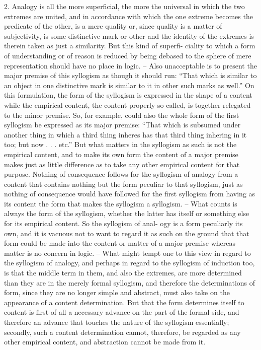 2. Analogy is all the more superficial, the more the universal in which the
two extremes are united, and in accordance with which the one extreme
becomes the predicate of the other, is a mere quality or, since quality is a
matter of subjectivity, is some distinctive mark or other and the identity of
the extremes is therein taken as just a similarity. But this kind of superfi-
ciality to which a form of understanding or of reason is reduced by being
debased to the sphere of mere representation should have no place in logic. –
Also unacceptable is to present the major premise of this syllogism as though
it should run: “That which is similar to an object in one distinctive mark
is similar to it in other such marks as well.” On this formulation, the form
of the syllogism is expressed in the shape of a content while the empirical
content, the content properly so called, is together relegated to the minor
premise. So, for example, could also the whole form of the first syllogism
be expressed as its major premise: “That which is subsumed under another
thing in which a third thing inheres has that third thing inhering in it
too; but now . . . etc.” But what matters in the syllogism as such is not the
empirical content, and to make its own form the content of a major premise
makes just as little difference as to take any other empirical content for that
purpose. Nothing of consequence follows for the syllogism of analogy from
a content that contains nothing but the form peculiar to that syllogism,
just as nothing of consequence would have followed for the first syllogism
from having as its content the form that makes the syllogism a syllogism. –
What counts is always the form of the syllogism, whether the latter has
itself or something else for its empirical content. So the syllogism of anal-
ogy is a form peculiarly its own, and it is vacuous not to want to regard it
as such on the ground that that form could be made into the content or
matter of a major premise whereas matter is no concern in logic. – What
might tempt one to this view in regard to the syllogism of analogy, and
perhaps in regard to the syllogism of induction too, is that the middle term
in them, and also the extremes, are more determined than they are in the
merely formal syllogism, and therefore the determinations of form, since
they are no longer simple and abstract, must also take on the appearance
of a content determination. But that the form determines itself to content is
first of all a necessary advance on the part of the formal side, and therefore
an advance that touches the nature of the syllogism essentially; secondly,
such a content determination cannot, therefore, be regarded as any other
empirical content, and abstraction cannot be made from it.

